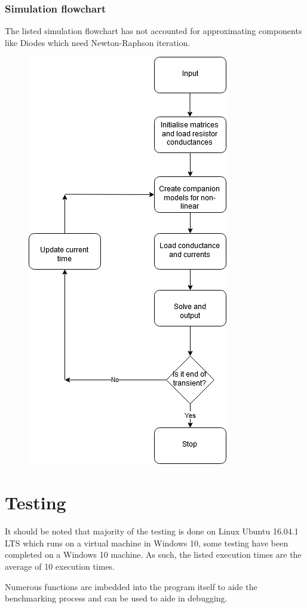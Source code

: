 \documentclass[12pt,a4paper]{article}
\begin{document}
	\subsubsection{Simulation flowchart} 
	The listed simulation flowchart has not accounted for approximating components like Diodes which need Newton-Raphson 
	iteration.
	\begin{figure} [h!]
		\centering
		\includegraphics[scale=0.5]{simulate.PNG} 
	\end{figure} 
\pagebreak

\section{Testing}
It should be noted that majority of the testing is done on Linux Ubuntu 16.04.1 LTS which runs on a virtual machine in Windows 10,
some testing have been completed on a Windows 10 machine. As such, the listed execution times are the average of 10 execution
times. \par 
Numerous functions are imbedded into the program itself to aide the benchmarking process and can be used to aide in debugging.
\pagebreak
\end{document}
